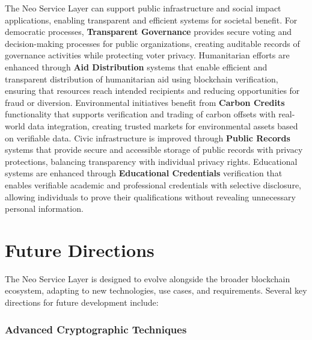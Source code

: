 \documentclass[11pt]{article}
\begin{document}
The Neo Service Layer can support public infrastructure and social impact applications, enabling transparent and efficient systems for societal benefit. For democratic processes, \textbf{Transparent Governance} provides secure voting and decision-making processes for public organizations, creating auditable records of governance activities while protecting voter privacy. Humanitarian efforts are enhanced through \textbf{Aid Distribution} systems that enable efficient and transparent distribution of humanitarian aid using blockchain verification, ensuring that resources reach intended recipients and reducing opportunities for fraud or diversion. Environmental initiatives benefit from \textbf{Carbon Credits} functionality that supports verification and trading of carbon offsets with real-world data integration, creating trusted markets for environmental assets based on verifiable data. Civic infrastructure is improved through \textbf{Public Records} systems that provide secure and accessible storage of public records with privacy protections, balancing transparency with individual privacy rights. Educational systems are enhanced through \textbf{Educational Credentials} verification that enables verifiable academic and professional credentials with selective disclosure, allowing individuals to prove their qualifications without revealing unnecessary personal information.

\section{Future Directions}
\label{subsec:nsl-future}

The Neo Service Layer is designed to evolve alongside the broader blockchain ecosystem, adapting to new technologies, use cases, and requirements. Several key directions for future development include:

\subsubsection{Advanced Cryptographic Techniques}
\label{subsubsec:advanced-crypto-techniques}
\end{document}

